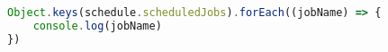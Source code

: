 \begin{lstlisting}[language=Javascript,caption={Penyediaan Daftar Semua Job}]
Object.keys(schedule.scheduledJobs).forEach((jobName) => {
    console.log(jobName)
})
\end{lstlisting}